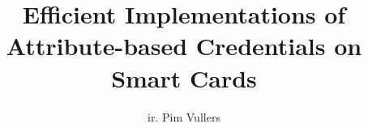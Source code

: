 \title{Efficient Implementations of Attribute-based Credentials on Smart Cards}
\author{ir. Pim Vullers}

\maketitle